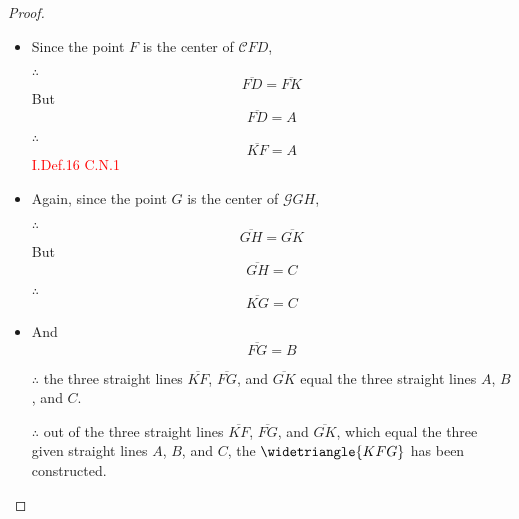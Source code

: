 \begin{proof}

\begin{itemize}

\item[]

\item Since the point $F$ is the center of $\mathscr{C}{FD}$, 

\item[$\therefore$] 
\[\overline{FD} = \overline{FK}\] 
But 
\[\overline{FD} = A\] 

\item[$\therefore$] 
\[\overline{KF} = A\] \hfill\textcolor{red}{I.Def.16 C.N.1}

\item Again, since the point $G$ is the center of $\mathscr{G}{GH}$,

\item[$\therefore$] 
\[\overline{GH} = \overline{GK}\]
 But 
\[\overline{GH} = C\] 

\clearpage
 
 \item[$\therefore$] 
 \[\overline{KG} = C\]

\item And 
\[\overline{FG} = B\]

\item[$\therefore$] the three straight lines $\overline{KF}$, $\overline{FG}$, and $\overline{GK}$ equal the three straight lines $A$, $B$, and $C$.

\item[$\therefore$] out of the three straight lines $\overline{KF}$, $\overline{FG}$, and $\overline{GK}$, which equal the three given straight lines $A$, $B$, and $C$, the $\widetriangle{KFG}$ has been constructed.

\end{itemize}

\end{proof}

\clearpage
